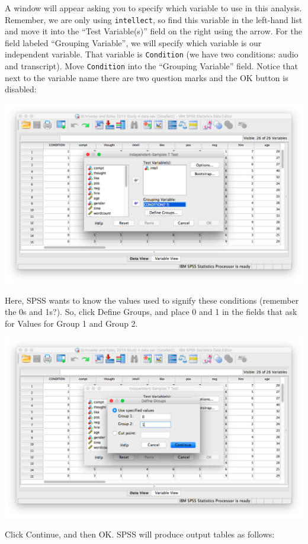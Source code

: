 \documentclass[
]{book}
\begin{document}
A window will appear asking you to specify which variable to use in this analysis. Remember, we are only using \texttt{intellect}, so find this variable in the left-hand list and move it into the ``Test Variable(s)'' field on the right using the arrow. For the field labeled ``Grouping Variable'', we will specify which variable is our independent variable. That variable is \texttt{Condition} (we have two conditions: audio and transcript). Move \texttt{Condition} into the ``Grouping Variable'' field. Notice that next to the variable name there are two question marks and the OK button is disabled:

\includegraphics{img/7.4.15.png}

Here, SPSS wants to know the values used to signify these conditions (remember the 0s and 1s?). So, click {Define Groups}, and place 0 and 1 in the fields that ask for Values for Group 1 and Group 2.

\includegraphics{img/7.4.16.png}

Click {Continue}, and then {OK}. SPSS will produce output tables as follows:
\end{document}
